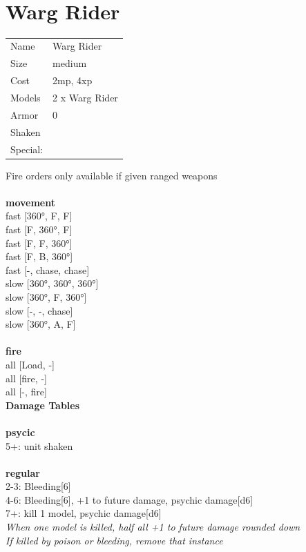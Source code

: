 \ \\













\clearpage

\section{ Warg Rider }

\begin{tabular}{ll}
  Name & Warg Rider \\
  Size & medium\\
  Cost & 2mp, 4xp\\
  Models & 2 x Warg Rider\\
  Armor & 0\\
  Shaken & \\
  Special: \\
\end{tabular}

\noindent Fire orders only available if given ranged weapons\\ 


\ \\ {\bf movement } \\
fast [360°, F, F] \\
fast [F, 360°, F] \\
fast [F, F, 360°] \\
fast [F, B, 360°] \\
fast [-, chase, chase] \\
slow [360°, 360°, 360°] \\
slow [360°, F, 360°] \\
slow [-, -, chase] \\
slow [360°, A, F] \\
\ \\ {\bf fire } \\
all [Load, -] \\
all [fire, -] \\
all [-, fire] \\


{\bf Damage Tables} \\
\ \\ {\bf psycic } \\
5+: unit shaken \\
\ \\ {\bf regular } \\
2-3: Bleeding[6] \\
4-6: Bleeding[6], +1 to future damage, psychic damage[d6] \\
7+: kill 1 model, psychic damage[d6] \\
{{\it When one model is killed, half all +1 to future damage rounded down}} \\
{{\it If killed by poison or bleeding, remove that instance}} \\


